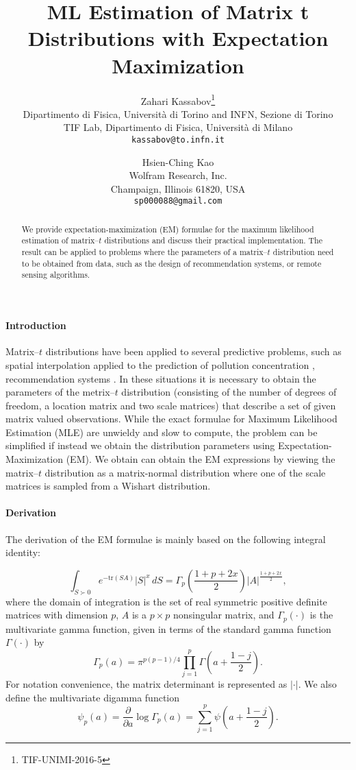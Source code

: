 \documentclass[english,listof=totoc]{scrartcl}
\title{ML Estimation of Matrix t Distributions with Expectation Maximization}
\author{Zahari Kassabov\thanks{TIF-UNIMI-2016-5}\\
        Dipartimento di Fisica, Universit\`a di Torino and INFN, Sezione di Torino\\
		TIF Lab, Dipartimento di Fisica, Universit\`a di Milano\\
        \texttt{kassabov@to.infn.it}\\
        \and
        Hsien-Ching Kao\\
        Wolfram Research, Inc.\\
		Champaign, Illinois 61820, USA\\
		\texttt{sp000088@gmail.com}
		}
\begin{document}
\maketitle

\begin{abstract}
We provide expectation-maximization (EM) formulae for the maximum
likelihood estimation of matrix--$t$ distributions and discuss their
practical implementation.  The result can be applied to problems where
the parameters of a matrix--$t$ distribution need to be obtained from
data, such as the design of recommendation systems, or remote sensing
algorithms.
\end{abstract}

\paragraph{Introduction}
Matrix--$t$ distributions have been applied to several predictive
problems, such as spatial interpolation applied to the prediction of
pollution concentration \citep{KIBRIA2006785}, recommendation systems
\citep{NIPS2007_3203}. In these situations it is necessary to obtain
the parameters of the metrix--$t$ distribution (consisting of the
number of degrees of freedom, a location matrix and two scale
matrices) that describe a set of given matrix valued observations.
While the exact formulae for Maximum Likelihood Estimation (MLE) are
unwieldy and slow to compute, the problem can be simplified if instead
we obtain the distribution parameters using Expectation-Maximization
(EM). We obtain can obtain the EM expressions by viewing the
matrix--$t$  distribution as a matrix-normal distribution where one of
the scale matrices is sampled from a Wishart distribution.

\paragraph{Derivation}

The derivation of the EM formulae is mainly based on the following
integral identity:

\begin{equation}
\int_{S\succ 0}e^{-\textrm{tr}(SA)}|S|^{x}\,dS=\Gamma_{p}\left(\frac{1+p+2x}{2}\right)|A|^{\frac{1+p+2x}{2}},\label{eq:intmultgammadef}
\end{equation}
where the domain of integration is the set of real symmetric
positive definite matrices with dimension $p$, $A$ is a $p\times p$
nonsingular matrix, and $\Gamma_{p}(\cdot)$ is the multivariate gamma
function, given in terms of the standard gamma function $\Gamma(\cdot)$
by
\begin{equation}
\Gamma_{p}(a)=\pi^{p(p-1)/4}\prod_{j=1}^{p}\Gamma\left(a+\frac{1-j}{2}\right).\label{eq:multgammadef}
\end{equation}
For notation convenience, the matrix determinant is represented as
$|\cdot|$. We also define the multivariate digamma function
%
\begin{equation} \psi_{p}(a)=\frac{\partial}{\partial
	a}\log\Gamma_{p}(a)=\sum_{j=1}^{p}\psi\left(a+\frac{1-j}{2}\right).
\end{equation}
\end{document}

